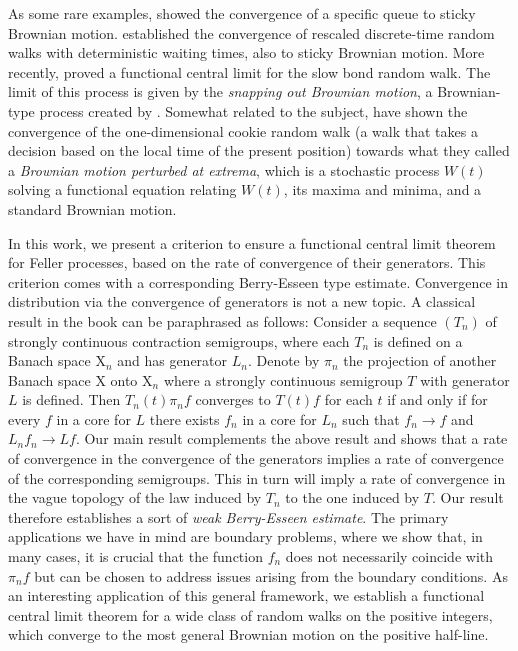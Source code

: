 \documentclass[12pt,a4paper]{article}
\theoremstyle{plain}
\theoremstyle{remark}
\begin{document}
	As some rare examples, \cite{Harrison_Lemoine} showed the convergence of a specific queue to sticky Brownian motion. \cite{Amir} established the convergence of rescaled discrete-time random walks with deterministic waiting times, also to sticky Brownian motion. More recently, \cite{EFS2020} proved a functional central limit for the slow bond random walk. The limit of this process is given by the \textit{snapping out Brownian motion}, a Brownian-type process created  by \cite{Lejay}. Somewhat related to the subject,  \cite{cookie} have shown the convergence of the one-dimensional cookie random walk (a walk that takes a decision based on the local time of the present position) towards what they called a \textit{Brownian motion perturbed at extrema}, which is a stochastic process $W(t)$ solving a functional equation relating $W(t)$, its maxima and minima, and a standard Brownian motion.
	
	In this work, we present a criterion to ensure a functional central limit theorem for Feller processes, based on the rate of convergence of their generators. This criterion comes with a corresponding Berry-Esseen type estimate. Convergence in distribution via the convergence of generators is not a new topic. A classical result in the book \citet[Theorem 6.1 on page 28]{EK} can be paraphrased as follows: Consider a sequence $(T_n)$ of strongly continuous contraction semigroups, where each $T_n$ is defined on a Banach space $\text{X}_n$ and has generator $L_n$. Denote by $\pi_n$ the projection of another Banach space $\text{X}$ onto $\text{X}_n$ where a strongly continuous semigroup $T$ with generator $L$ is defined. Then $T_n(t)\pi_n f$ converges to $T(t)f$ for each $t$ if and only if for every $f$ in a core for $L$ there exists $f_n$ in a core for $L_n$ such that $f_n\to f$ and $L_n f_n\to Lf$. Our main result complements the above result and shows that a rate of convergence in the convergence of the generators implies a rate of convergence of the corresponding semigroups. This in turn will imply a rate of convergence in the vague topology of the law induced by $T_n$ to the one induced by $T$. Our result therefore establishes a sort of \emph{weak Berry-Esseen estimate}. The primary applications we have in mind are boundary problems, where we show that, in many cases, it is crucial that the function $f_n$ does not necessarily coincide with $\pi_n f$ but can be chosen to address issues arising from the boundary conditions. As an interesting application of this general framework, we establish a functional central limit theorem for a wide class of random walks on the positive integers, which converge to the most general Brownian motion on the positive half-line.
	
\end{document}
